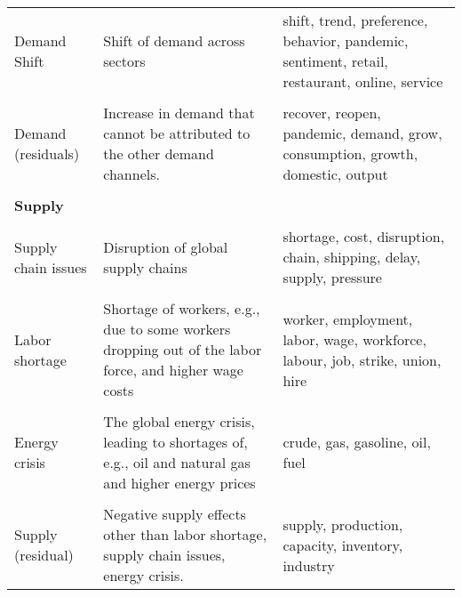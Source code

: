 \begin{table}
\begin{scriptsize}
\begin{tabular}[htp]{p{3.5cm}|p{5cm}|p{5cm}}
			Demand Shift             & Shift of demand across sectors 
			& shift, trend, preference, behavior, pandemic, sentiment, retail, restaurant, online, service                                                                                \\ \\[0.02cm]
			Demand (residuals)         & Increase in demand that cannot be attributed to the other demand channels. & recover, reopen, pandemic, demand, grow, consumption, growth, domestic, output   \\
			&                                                                                                                                                                                                 &                                                                                                                                             \\
			\textbf{Supply}          &                                                                                                                                                                                                 &                                                                                                                                             \\ \midrule \\[0.02cm]
			Supply chain issues      & Disruption of global supply chains                                                                                                                                                             & shortage, cost, disruption, chain, shipping, delay, supply, pressure                                                       \\ \\[0.02cm]
			Labor shortage           & Shortage of workers, e.g., due   to some workers dropping out of the labor force, and higher wage costs  & worker, employment, labor, wage, workforce, labour, job, strike, union, hire            \\ \\[0.02cm]
			Energy crisis            &  The global energy crisis,   leading to shortages of, e.g., oil and natural gas and higher energy prices 
			& crude, gas, gasoline, oil, fuel                                                                                                             \\ \\[0.02cm]
			Supply (residual) & Negative supply effects other than labor shortage, supply chain issues, energy crisis. &  supply, production, capacity, inventory, industry  \\

\end{tabular}
\end{scriptsize}
\end{table}
